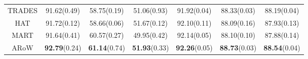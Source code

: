 \documentclass[nohyperref]{article}
\theoremstyle{plain}
\theoremstyle{definition}
\theoremstyle{remark}
\begin{document}
\begin{table}[ht]
\begin{tabular}{c|ccc|ccc}
    TRADES                      & 91.62(0.49) & 58.75(0.19) & 51.06(0.93) &  91.92(0.04) & 88.33(0.03) & 88.19(0.04) \\
    HAT                         & 91.72(0.12) & 58.66(0.06) & 51.67(0.12) &  92.10(0.11) & 88.09(0.16) & 87.93(0.13) \\
    MART                       & 91.64(0.41) & 60.57(0.27) & 49.95(0.42) &  92.14(0.05) & 88.10(0.10) & 87.88(0.14) \\
    ARoW                     & \textbf{92.79}(0.24) & \textbf{61.14}(0.74) & \textbf{51.93}(0.33) &  \textbf{92.26}(0.05) & \textbf{88.73}(0.03) & \textbf{88.54}(0.04)\\
    \bottomrule
  \end{tabular}
  \label{table:compare}
\end{table}
\end{document}
